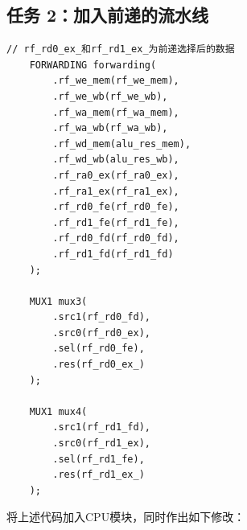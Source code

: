 \documentclass[12pt,a4paper]{ctexart}
\begin{document}
\subsection{任务 2：加入前递的流水线}
\begin{lstlisting}[style=verilog]
    // rf_rd0_ex_和rf_rd1_ex_为前递选择后的数据
    FORWARDING forwarding(
        .rf_we_mem(rf_we_mem),
        .rf_we_wb(rf_we_wb),
        .rf_wa_mem(rf_wa_mem),
        .rf_wa_wb(rf_wa_wb),
        .rf_wd_mem(alu_res_mem),
        .rf_wd_wb(alu_res_wb),
        .rf_ra0_ex(rf_ra0_ex),
        .rf_ra1_ex(rf_ra1_ex),
        .rf_rd0_fe(rf_rd0_fe),
        .rf_rd1_fe(rf_rd1_fe),
        .rf_rd0_fd(rf_rd0_fd),
        .rf_rd1_fd(rf_rd1_fd)
    );

    MUX1 mux3(
        .src1(rf_rd0_fd),
        .src0(rf_rd0_ex),
        .sel(rf_rd0_fe),
        .res(rf_rd0_ex_)
    );

    MUX1 mux4(
        .src1(rf_rd1_fd),
        .src0(rf_rd1_ex),
        .sel(rf_rd1_fe),
        .res(rf_rd1_ex_)
    );
\end{lstlisting}
将上述代码加入CPU模块，同时作出如下修改：
\end{document}
